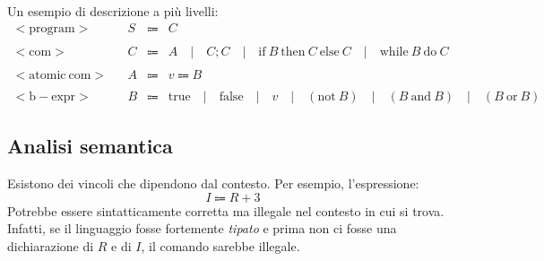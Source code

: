 \documentclass[a4paper]{article}
\begin{document}
	\noindent
	Un esempio di descrizione a più livelli:
	\begin{equation*}
		\begin{array}{lllll}
			\mathrm{<program>} 		&& S & \Coloneqq & C \\
			\\
			\mathrm{<com>}			&& C & \Coloneqq & A \hspace{1em} | \hspace{1em} C ; C \hspace{1em} | \hspace{1em} \mathrm{if} \: B \: \mathrm{then} \: C \: \mathrm{else} \: C \hspace{1em} | \hspace{1em} \mathrm{while} \: B \: \mathrm{do} \: C \\
			\\
			\mathrm{<atomic \: com>}&& A & \Coloneqq & v \Coloneq B \\
			\\
			\mathrm{<b-expr>}		&& B & \Coloneqq & \mathrm{true} \hspace{1em} | \hspace{1em} \mathrm{false} \hspace{1em} | \hspace{1em} v \hspace{1em} | \hspace{1em} \left(\mathrm{not} \: B\right) \hspace{1em} | \hspace{1em} \left(B \: \mathrm{and} \: B\right) \hspace{1em} | \hspace{1em} \left(B \: \mathrm{or} \: B\right)
		\end{array}
	\end{equation*}\newpage

	\subsection{Analisi semantica}

	Esistono dei vincoli che dipendono dal contesto. Per esempio, l'espressione:
	\begin{equation*}
		I \Coloneq R + 3
	\end{equation*}
	Potrebbe essere sintatticamente corretta ma illegale nel contesto in cui si trova. Infatti, se il linguaggio fosse fortemente \emph{tipato} e prima non ci fosse una dichiarazione di $R$ e di $I$, il comando sarebbe illegale.\newline
\end{document}

